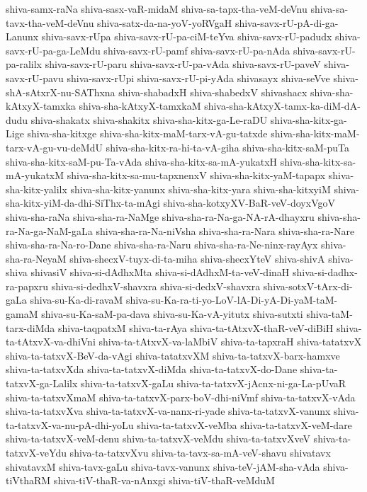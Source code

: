 {shiva-samx-raNa
shiva-sasx-vaR-midaM
shiva-sa-tapx-tha-veM-deVnu
shiva-sa-tavx-tha-veM-deVnu
shiva-satx-da-na-yoV-yoRVgaH
shiva-savx-rU-pA-di-ga-Lanunx
shiva-savx-rUpa
shiva-savx-rU-pa-ciM-teYva
shiva-savx-rU-padudx
shiva-savx-rU-pa-ga-LeMdu
shiva-savx-rU-pamf
shiva-savx-rU-pa-nAda
shiva-savx-rU-pa-ralilx
shiva-savx-rU-paru
shiva-savx-rU-pa-vAda
shiva-savx-rU-paveV
shiva-savx-rU-pavu
shiva-savx-rUpi
shiva-savx-rU-pi-yAda
shivasayx
shiva-seVve
shiva-shA-sAtxrX-nu-SAThxna
shiva-shabadxH
shiva-shabedxV
shivashacx
shiva-sha-kAtxyX-tamxka
shiva-sha-kAtxyX-tamxkaM
shiva-sha-kAtxyX-tamx-ka-diM-dA-dudu
shiva-shakatx
shiva-shakitx
shiva-sha-kitx-ga-Le-raDU
shiva-sha-kitx-ga-Lige
shiva-sha-kitxge
shiva-sha-kitx-maM-tarx-vA-gu-tatxde
shiva-sha-kitx-maM-tarx-vA-gu-vu-deMdU
shiva-sha-kitx-ra-hi-ta-vA-giha
shiva-sha-kitx-saM-puTa
shiva-sha-kitx-saM-pu-Ta-vAda
shiva-sha-kitx-sa-mA-yukatxH
shiva-sha-kitx-sa-mA-yukatxM
shiva-sha-kitx-sa-mu-tapxnenxV
shiva-sha-kitx-yaM-tapapx
shiva-sha-kitx-yalilx
shiva-sha-kitx-yanunx
shiva-sha-kitx-yara
shiva-sha-kitxyiM
shiva-sha-kitx-yiM-da-dhi-SiThx-ta-mAgi
shiva-sha-kotxyXV-BaR-veV-doyxVgoV
shiva-sha-raNa
shiva-sha-ra-NaMge
shiva-sha-ra-Na-ga-NA-rA-dhayxru
shiva-sha-ra-Na-ga-NaM-gaLa
shiva-sha-ra-Na-niVsha
shiva-sha-ra-Nara
shiva-sha-ra-Nare
shiva-sha-ra-Na-ro-Dane
shiva-sha-ra-Naru
shiva-sha-ra-Ne-ninx-rayAyx
shiva-sha-ra-NeyaM
shiva-shecxV-tuyx-di-ta-miha
shiva-shecxYteV
shiva-shivA
shiva-shiva
shivasiV
shiva-si-dAdhxMta
shiva-si-dAdhxM-ta-veV-dinaH
shiva-si-dadhx-ra-papxru
shiva-si-dedhxV-shavxra
shiva-si-dedxV-shavxra
shiva-sotxV-tArx-di-gaLa
shiva-su-Ka-di-ravaM
shiva-su-Ka-ra-ti-yo-LoV-lA-Di-yA-Di-yaM-taM-gamaM
shiva-su-Ka-saM-pa-dava
shiva-su-Ka-vA-yitutx
shiva-sutxti
shiva-taM-tarx-diMda
shiva-taqpatxM
shiva-ta-rAya
shiva-ta-tAtxvX-thaR-veV-diBiH
shiva-ta-tAtxvX-va-dhiVni
shiva-ta-tAtxvX-va-laMbiV
shiva-ta-tapxraH
shiva-tatatxvX
shiva-ta-tatxvX-BeV-da-vAgi
shiva-tatatxvXM
shiva-ta-tatxvX-barx-hamxve
shiva-ta-tatxvXda
shiva-ta-tatxvX-diMda
shiva-ta-tatxvX-do-Dane
shiva-ta-tatxvX-ga-Lalilx
shiva-ta-tatxvX-gaLu
shiva-ta-tatxvX-jAcnx-ni-ga-La-pUvaR
shiva-ta-tatxvXmaM
shiva-ta-tatxvX-parx-boV-dhi-niVmf
shiva-ta-tatxvX-vAda
shiva-ta-tatxvXva
shiva-ta-tatxvX-va-nanx-ri-yade
shiva-ta-tatxvX-vanunx
shiva-ta-tatxvX-va-nu-pA-dhi-yoLu
shiva-ta-tatxvX-veMba
shiva-ta-tatxvX-veM-dare
shiva-ta-tatxvX-veM-denu
shiva-ta-tatxvX-veMdu
shiva-ta-tatxvXveV
shiva-ta-tatxvX-veYdu
shiva-ta-tatxvXvu
shiva-ta-tavx-sa-mA-veV-shavu
shivatavx
shivatavxM
shiva-tavx-gaLu
shiva-tavx-vanunx
shiva-teV-jAM-sha-vAda
shiva-tiVthaRM
shiva-tiV-thaR-va-nAnxgi
shiva-tiV-thaR-veMduM
}
